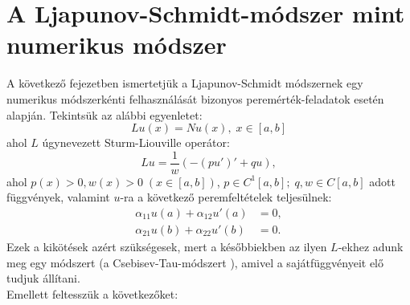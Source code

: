 \documentclass[oneside, titlepage, 12pt, a4paper]{report}
\begin{document}


\onehalfspacing
\chapter{A Ljapunov-Schmidt-módszer mint numerikus módszer}
\label{chap:numeric}

A következő fejezetben ismertetjük a Ljapunov-Schmidt módszernek egy numerikus módszerkénti felhasználását bizonyos peremérték-feladatok esetén \cite{LSNum} alapján. %
Tekintsük az alábbi egyenletet:
\begin{equation}
Lu(x) = Nu(x),\;x\in[a, b] \label{eq:num:1}
\end{equation}
ahol $L$ úgynevezett Sturm-Liouville operátor:
\begin{equation*}
L u = \frac{1}{w} ( -(p u')' + q u),
\end{equation*}
ahol $p(x) > 0, w(x) > 0\;(x \in [a, b])$, $p \in C^1[a, b];\;q, w \in C[a, b]$ adott függvények, valamint $u$-ra a következő peremfeltételek teljesülnek:
\begin{align*}
\alpha_{11}u(a) + \alpha_{12}u'(a) &= 0, \\
\alpha_{21}u(b) + \alpha_{22}u'(b) &= 0.
\end{align*}
Ezek a kikötések azért szükségesek, mert a későbbiekben az ilyen $L$-ekhez adunk meg egy módszert (a Csebisev-Tau-módszert \cite{ChebysevTau}), amivel a sajátfüggvényeit elő tudjuk állítani. \\ %
Emellett feltesszük a következőket:
\end{document}
